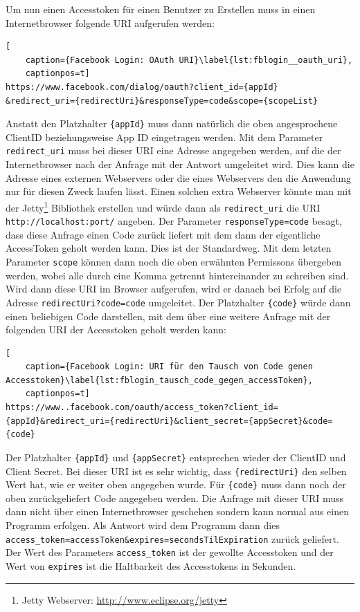 Um nun einen Accesstoken für einen Benutzer zu Erstellen muss in einen Internetbrowser folgende URI aufgerufen werden:

\begin{lstlisting}[
    caption={Facebook Login: OAuth URI}\label{lst:fblogin__oauth_uri},
    captionpos=t]
https://www.facebook.com/dialog/oauth?client_id={appId}   &redirect_uri={redirectUri}&responseType=code&scope={scopeList}
\end{lstlisting}

Anstatt den Platzhalter \texttt{\{appId\}} muss dann natürlich die oben angesprochene ClientID beziehungsweise App ID eingetragen werden. Mit dem Parameter \texttt{redirect\_uri} muss bei dieser URI eine Adresse angegeben werden, auf die der Internetbrowser nach der Anfrage mit der Antwort umgeleitet wird. Dies kann die Adresse eines externen Webservers oder die eines Webservers den die Anwendung nur für diesen Zweck laufen lässt. Einen solchen extra Webserver könnte man mit der Jetty\footnote{Jetty Webserver: \url{http://www.eclipse.org/jetty}} Bibliothek erstellen und würde dann als \texttt{redirect\_uri} die URI \texttt{http://localhost:{port}/} angeben. Der Parameter \texttt{responseType=code} besagt, dass diese Anfrage einen Code zurück liefert mit dem dann der eigentliche AccessToken geholt werden kann. Dies ist der Standardweg. Mit dem letzten Parameter \texttt{scope} können dann noch die oben erwähnten Permissons übergeben werden, wobei alle durch eine Komma getrennt hintereinander zu schreiben sind. Wird dann diese URI im Browser aufgerufen, wird er danach bei Erfolg auf die Adresse \texttt{{redirectUri}?code={code}} umgeleitet. Der Platzhalter \texttt{\{code\}} würde dann einen beliebigen Code darstellen, mit dem über eine weitere Anfrage mit der folgenden URI der Accesstoken geholt werden kann:

\begin{lstlisting}[
    caption={Facebook Login: URI für den Tausch von Code genen Accesstoken}\label{lst:fblogin_tausch_code_gegen_accessToken},
    captionpos=t]
https://www..facebook.com/oauth/access_token?client_id={appId}&redirect_uri={redirectUri}&client_secret={appSecret}&code={code}
\end{lstlisting}

Der Platzhalter \texttt{\{appId\}} und \texttt{\{appSecret\}} entsprechen wieder der ClientID und Client Secret. Bei dieser URI ist es sehr wichtig, dass \texttt{\{redirectUri\}} den selben Wert hat, wie er weiter oben angegeben wurde. Für \texttt{\{code\}} muss dann noch der oben zurückgeliefert Code angegeben werden. Die Anfrage mit dieser URI muss dann nicht über einen Internetbrowser geschehen sondern kann normal aus einen Programm erfolgen. Als Antwort wird dem Programm dann dies \texttt{access\_token={accessToken}\&expires={secondsTilExpiration}} zurück geliefert. Der Wert des Parameters \texttt{access\_token} ist der gewollte Accesstoken und der Wert von \texttt{expires} ist die Haltbarkeit des Accesstokens in Sekunden.

